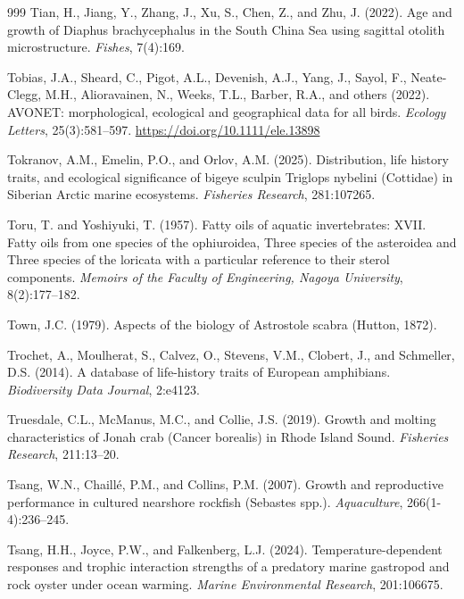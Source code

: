 \begin{thebibliography}{999}
Tian, H., Jiang, Y., Zhang, J., Xu, S., Chen, Z., and Zhu, J. (2022). Age and growth of Diaphus brachycephalus in the South China Sea using sagittal otolith microstructure. \textit{Fishes}, 7(4):169.

Tobias, J.A., Sheard, C., Pigot, A.L., Devenish, A.J., Yang, J., Sayol, F., Neate-Clegg, M.H., Alioravainen, N., Weeks, T.L., Barber, R.A., and others (2022). AVONET: morphological, ecological and geographical data for all birds. \textit{Ecology Letters}, 25(3):581--597. \url{https://doi.org/10.1111/ele.13898}

Tokranov, A.M., Emelin, P.O., and Orlov, A.M. (2025). Distribution, life history traits, and ecological significance of bigeye sculpin Triglops nybelini (Cottidae) in Siberian Arctic marine ecosystems. \textit{Fisheries Research}, 281:107265.

Toru, T. and Yoshiyuki, T. (1957). Fatty oils of aquatic invertebrates: XVII. Fatty oils from one species of the ophiuroidea, Three species of the asteroidea and Three species of the loricata with a particular reference to their sterol components. \textit{Memoirs of the Faculty of Engineering, Nagoya University}, 8(2):177--182.

Town, J.C. (1979). Aspects of the biology of Astrostole scabra (Hutton, 1872).

Trochet, A., Moulherat, S., Calvez, O., Stevens, V.M., Clobert, J., and Schmeller, D.S. (2014). A database of life-history traits of European amphibians. \textit{Biodiversity Data Journal}, 2:e4123.

Truesdale, C.L., McManus, M.C., and Collie, J.S. (2019). Growth and molting characteristics of Jonah crab (Cancer borealis) in Rhode Island Sound. \textit{Fisheries Research}, 211:13--20.

Tsang, W.N., Chaill{\'e}, P.M., and Collins, P.M. (2007). Growth and reproductive performance in cultured nearshore rockfish (Sebastes spp.). \textit{Aquaculture}, 266(1-4):236--245.

Tsang, H.H., Joyce, P.W., and Falkenberg, L.J. (2024). Temperature-dependent responses and trophic interaction strengths of a predatory marine gastropod and rock oyster under ocean warming. \textit{Marine Environmental Research}, 201:106675.


\end{thebibliography}
